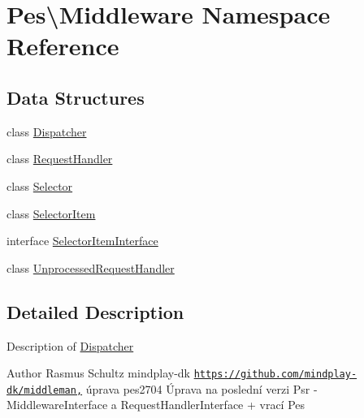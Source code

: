 \hypertarget{namespace_pes_1_1_middleware}{}\section{Pes\textbackslash{}Middleware Namespace Reference}
\label{namespace_pes_1_1_middleware}
\subsection*{Data Structures}
\begin{DoxyCompactItemize}
\item 
class \mbox{\hyperlink{class_pes_1_1_middleware_1_1_dispatcher}{Dispatcher}}
\item 
class \mbox{\hyperlink{class_pes_1_1_middleware_1_1_request_handler}{Request\+Handler}}
\item 
class \mbox{\hyperlink{class_pes_1_1_middleware_1_1_selector}{Selector}}
\item 
class \mbox{\hyperlink{class_pes_1_1_middleware_1_1_selector_item}{Selector\+Item}}
\item 
interface \mbox{\hyperlink{interface_pes_1_1_middleware_1_1_selector_item_interface}{Selector\+Item\+Interface}}
\item 
class \mbox{\hyperlink{class_pes_1_1_middleware_1_1_unprocessed_request_handler}{Unprocessed\+Request\+Handler}}
\end{DoxyCompactItemize}


\subsection{Detailed Description}
Description of \mbox{\hyperlink{class_pes_1_1_middleware_1_1_dispatcher}{Dispatcher}}

\begin{DoxyAuthor}{Author}
Rasmus Schultz mindplay-\/dk \href{https://github.com/mindplay-dk/middleman,}{\tt https\+://github.\+com/mindplay-\/dk/middleman,} úprava pes2704 Úprava na poslední verzi Psr -\/ Middleware\+Interface a Request\+Handler\+Interface + vrací Pes 
\end{DoxyAuthor}
